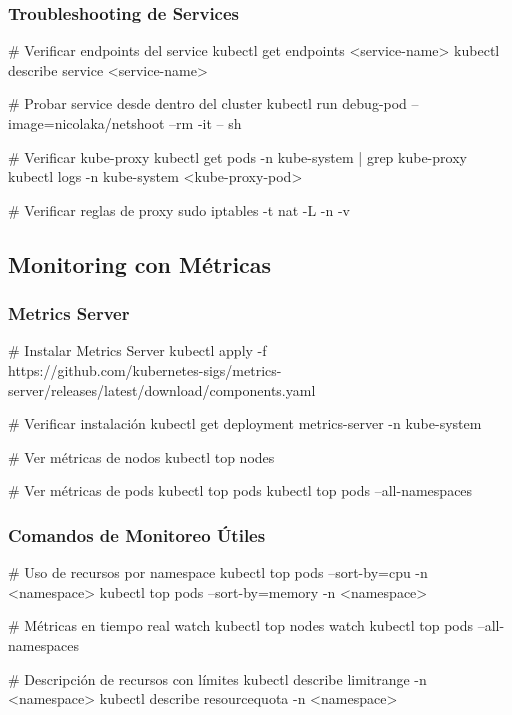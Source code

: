 \documentclass[11pt,a4paper]{article}
\begin{document}
\subsubsection{Troubleshooting de Services}

\begin{commandbox}
\# Verificar endpoints del service
kubectl get endpoints <service-name>
kubectl describe service <service-name>

\# Probar service desde dentro del cluster
kubectl run debug-pod --image=nicolaka/netshoot --rm -it -- sh

\# Verificar kube-proxy
kubectl get pods -n kube-system | grep kube-proxy
kubectl logs -n kube-system <kube-proxy-pod>

\# Verificar reglas de proxy
sudo iptables -t nat -L -n -v
\end{commandbox}

\subsection{Monitoring con Métricas}

\subsubsection{Metrics Server}

\begin{commandbox}
\# Instalar Metrics Server
kubectl apply -f \\
  https://github.com/kubernetes-sigs/metrics-server/releases/latest/download/components.yaml

\# Verificar instalación
kubectl get deployment metrics-server -n kube-system

\# Ver métricas de nodos
kubectl top nodes

\# Ver métricas de pods
kubectl top pods
kubectl top pods --all-namespaces
\end{commandbox}

\subsubsection{Comandos de Monitoreo Útiles}

\begin{commandbox}
\# Uso de recursos por namespace
kubectl top pods --sort-by=cpu -n <namespace>
kubectl top pods --sort-by=memory -n <namespace>

\# Métricas en tiempo real
watch kubectl top nodes
watch kubectl top pods --all-namespaces

\# Descripción de recursos con límites
kubectl describe limitrange -n <namespace>
kubectl describe resourcequota -n <namespace>
\end{commandbox}
\end{document}
